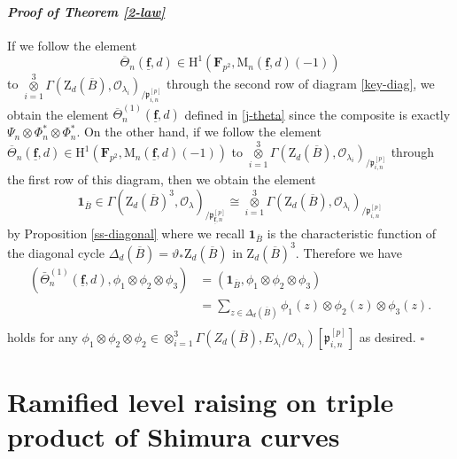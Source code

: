 \documentclass[10pt]{amsart}
\numberwithin{equation}{section}
\theoremstyle{plain}
\numberwithin{equation}{section}
\theoremstyle{definition}
\theoremstyle{remark}
\newenvironment{myproof}[2] {\paragraph{\emph{Proof of {#1} {#2} }}}{\hfill$\square$}
\def\triplef{\underline{\mathbf{f}}}
\def\threetensor{\overset{3}{\underset{i=1}\otimes}}
\def\calO{\mathcal{O}}
\def\frakp{\mathfrak{p}}
\def\FF{\mathbf{F}}
\def\rmH{\mathrm{H}}
\def\rmM{\mathrm{M}}
\def\rmZ{\mathrm{Z}}
\begin{document}
\begin{myproof}{Theorem \ref{2-law}}{}
If we follow the element 
\begin{equation*}
\overline{\Theta}_{n}(\triplef, d)\in\rmH^{1}(\FF_{p^{2}}, \rmM_{n}(\triplef, d)(-1)) 
\end{equation*}
to $\threetensor\Gamma(\rmZ_{d}(\overline{B}), \calO_{\lambda_{i}})_{/\frakp^{[p]}_{i, n}}$ through the second row of diagram \ref{key-diag}, we obtain  the element $\overline{\Theta}^{(1)}_{n}(\triplef, d)$ defined in \ref{j-theta} since the composite is exactly $\Psi_{n}\otimes\Phi^{\ast}_{n}\otimes\Phi^{\ast}_{n}$. On the other hand, if we follow the element $\overline{\Theta}_{n}(\triplef, d)\in\rmH^{1}(\FF_{p^{2}}, \rmM_{n}(\triplef, d)(-1))$ to $\threetensor\Gamma(\rmZ_{d}(\overline{B}), \calO_{\lambda_{i}})_{/\frakp^{[p]}_{i, n}}$ through the first row of this diagram, then we obtain the element  
\begin{equation*}
\mathbf{1}_{\overline{B}}\in \Gamma(\rmZ_{d}(\overline{B})^{3}, \calO_{\lambda})_{/\frakp^{[p]}_{\triplef,n}}\cong\threetensor\Gamma(\rmZ_{d}(\overline{B}), \calO_{\lambda_{i}})_{/\frakp^{[p]}_{i, n}} 
\end{equation*}
by Proposition \ref{ss-diagonal} where we recall $\mathbf{1}_{\overline{B}}$ is the characteristic function of the diagonal cycle $\Delta_{d}(\overline{B})=\vartheta_{\ast}\rmZ_{d}(\overline{B})$ in $\rmZ_{d}(\overline{B})^{3}$. Therefore we have
\begin{equation*}
\begin{aligned}
(\bar{\Theta}^{(1)}_{n}(\triplef, d), \phi_{1}\otimes\phi_{2}\otimes\phi_{3})&=(\mathbf{1}_{\overline{B}}, \phi_{1}\otimes\phi_{2}\otimes\phi_{3})\\
&=\sum_{z\in \Delta_{d}(\overline{B})} \phi_{1}(z)\otimes \phi_{2}(z)\otimes \phi_{3}(z).\\
\end{aligned}
\end{equation*} 
holds for any $\phi_{1}\otimes \phi_{2}\otimes \phi_{2}\in \otimes^{3}_{i=1}\Gamma(Z_{d}(\overline{B}),E_{\lambda_{i}}/ \calO_{\lambda_{i}})[\frakp^{[p]}_{i, n}]$ as desired.
\end{myproof}

\section{Ramified level raising on triple product of Shimura curves}
\end{document}
